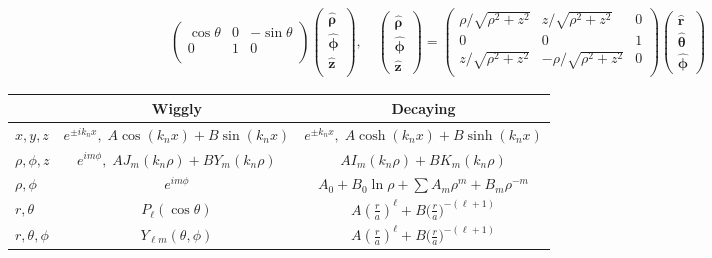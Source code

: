 \documentclass[10pt]{article}
\newcommand{\rhat}{\boldsymbol{\hat{\textbf{r}}}}
\newcommand{\zhat}{\boldsymbol{\hat{\textbf{z}}}}
\newcommand{\phihat}{\boldsymbol{\hat{\textbf{$\phi$}}}}
\newcommand{\thetahat}{\boldsymbol{\hat{\textbf{$\theta$}}}}
\newcommand{\rhohat}{\boldsymbol{\hat{\textbf{$\rho$}}}}
\begin{document}
\begin{multicols}{2}
\begin{align*}
\begin{pmatrix}
 			\cos \theta & 0 & -\sin \theta \\
 			0 & 1 & 0 \\
 		\end{pmatrix}
 		\begin{pmatrix}
 			\rhohat \\
 			\phihat \\
 			\zhat \\
 		\end{pmatrix}, \quad 
 		\begin{pmatrix}
			\rhohat \\
			\phihat \\
			\zhat
 		\end{pmatrix} = 
 		\begin{pmatrix}
 			\rho / \sqrt{\rho^2 + z^2} & z / \sqrt{\rho^2 + z^2} & 0 \\
 			0 & 0 & 1 \\
 			z / \sqrt{\rho^2 + z^2} & - \rho /\sqrt{\rho^2 + z^2} & 0 \\
 		\end{pmatrix}
 		\begin{pmatrix}
			\rhat \\
			\thetahat \\
			\phihat
 		\end{pmatrix}
 	\end{align*}
	\renewcommand{\arraystretch}{2}
	\begin{tabular}{| l | c | c |} \hline
		& Wiggly & Decaying \\ \hline
		$x,y,z$ &$ e^{\pm i k_n x}, \; A \cos(k_n x) + B\sin(k_n x)$ & $e^{\pm k_n x}, \; A \cosh( k_n x) + B \sinh(k_n x)$ \\ \hline
		$\rho,\phi,z$ & $e^{i m \phi}, \; A J_m(k_n \rho) + B Y_m(k_n \rho)$ & $ A I_m(k_n \rho) + B K_m(k_n \rho)$ \\ \hline
		$\rho,\phi$ & $e^{i m \phi}$ & $A_0 + B_0 \ln \rho + \sum A_m \rho^m + B_m \rho^{-m}$ \\ \hline
		$r,\theta$ & $P_\ell(\cos \theta)$ & $A \left( \frac{r}{a} \right)^\ell + B \big( \frac{r}{a} \big)^{-(\ell+1)} $ \\ \hline
		$r, \theta, \phi$ & $Y_{\ell m}(\theta, \phi)$ &  $A \left( \frac{r}{a} \right)^\ell + B \big( \frac{r}{a} \big)^{-(\ell+1)} $ \\ \hline
	\end{tabular}
\end{multicols}
 
\end{document}
